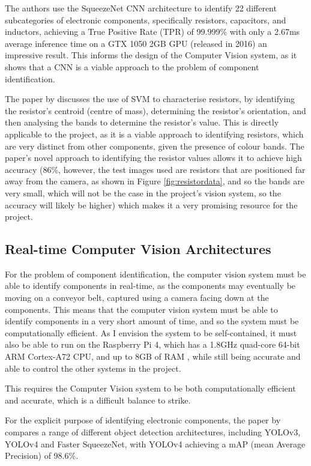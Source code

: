 The authors \citet{Xu2020} use the SqueezeNet CNN architecture to identify 22 different subcategories of electronic components, specifically resistors, capacitors, and inductors, achieving a True Positive Rate (TPR) of 99.999\% with only a 2.67ms average inference time on a 
GTX 1050 2GB GPU (released in 2016) an impressive result. This informs the design of the Computer Vision system, as it shows that a CNN is a viable approach to the problem of component identification.

The paper by \citet{8939034} discusses the use of SVM to characterise resistors, by identifying the resistor's centroid (centre of mass), determining the resistor's orientation, and then analysing the bands to determine the resistor's value.
This is directly applicable to the project, as it is a viable approach to identifying resistors, which are very distinct from other components, given the presence of colour bands. The paper's novel approach to identifying the resistor values allows it to achieve high accuracy (86\%, however,
the test images used are resistors that are positioned far away from the camera, as shown in Figure \ref*{fig:resistordata}, and so the bands are very small, which will not be the case in the project's vision system, so the accuracy will likely be higher) which makes it a very promising resource for the project.


\subsection{Real-time Computer Vision Architectures}
For the problem of component identification, the computer vision system must be able to identify components in real-time, as the components may eventually be moving on a conveyor belt, captured using
a camera facing down at the components. This means that the computer vision system must be able to identify components in a very short amount of time, and so the system must be computationally efficient.
As I envision the system to be self-contained, it must also be able to run on the Raspberry Pi 4, which has a 1.8GHz quad-core 64-bit ARM Cortex-A72 CPU, and up to 8GB of RAM \cite{pi4}, while still being
accurate and able to control the other systems in the project.

This requires the Computer Vision system to be both computationally efficient and accurate, which is a difficult balance to strike.

For the explicit purpose of identifying electronic components, the paper by \citet{s22239079} compares a range of different object detection architectures, including YOLOv3, YOLOv4 and Faster SqueezeNet, with YOLOv4 achieving a mAP (mean Average Precision) of 98.6\%.

